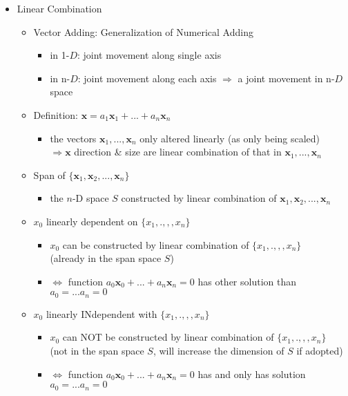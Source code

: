 \begin{itemize}
\item Linear Combination
	\begin{itemize}
	\item Vector Adding: Generalization of Numerical Adding
		\begin{itemize}
		\item in 1-$D$: joint movement along single axis
		\item in n-$D$: joint movement along each axis $\Rightarrow$ a joint movement in n-$D$ space
		\end{itemize}
	\item Definition: $\mathbf x = a_1\mathbf x_1 + ... + a_n\mathbf x_n$
		\begin{itemize}
		\item the vectors $\mathbf x_1,..., \mathbf x_n$ only altered linearly (as only being scaled) \\
			$\Rightarrow \mathbf x$ direction \& size are linear combination of that in $\mathbf x_1,..., \mathbf x_n$
		\end{itemize}
	\item Span of $\{\mathbf x_1, \mathbf x_2,...,\mathbf x_n\}$
		\begin{itemize}
		\item the $n$-D space $S$ constructed by linear combination of $\mathbf x_1, \mathbf x_2,...,\mathbf x_n$
		\end{itemize}
	\item $x_0$ linearly dependent on $\{x_1,.,,,x_n\}$ 
		\begin{itemize}
		\item $x_0$ can be constructed by linear combination of $\{x_1,.,,,x_n\}$ \\ 
		(already in the span space $S$)
		\item $\Leftrightarrow$ function $a_0\mathbf x_0 + ... + a_n\mathbf x_n=0$ has other solution than $a_0=...a_n=0$
		\end{itemize}
	\item $x_0$ linearly INdependent with $\{x_1,.,,,x_n\}$	
		\begin{itemize}
		\item $x_0$ can NOT be constructed by linear combination of $\{x_1,.,,,x_n\}$ \\ 
		(not in the span space $S$, will increase the dimension of $S$ if adopted)
		\item $\Leftrightarrow$ function $a_0\mathbf x_0 + ... + a_n\mathbf x_n=0$ has and only has solution $a_0=...a_n=0$
		\end{itemize}
	\end{itemize}


\end{itemize}
